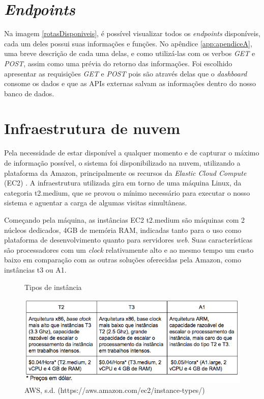 \section{\textit{Endpoints}}
\indent
\par Na imagem \ref{rotasDisponiveis}, é possível visualizar todos os \textit{endpoints} disponíveis, cada um deles possui suas informações e funções. No apêndice \ref{app:apendiceA}, uma breve descrição de cada uma delas, e como utilizá-las com os verbos \textit{GET} e \textit{POST}, assim como uma prévia do retorno das informações. Foi escolhido apresentar as requisições \textit{GET} e \textit{POST} pois são através delas que o \textit{dashboard} consome os dados e que as APIs externas salvam as informações dentro do nosso banco de dados.

\section{Infraestrutura de nuvem}
\indent
\par Pela necessidade de estar disponível a qualquer momento e de capturar o máximo de informação possível, o sistema foi disponibilizado na nuvem, utilizando a plataforma da Amazon, principalmente os recursos da \textit{Elastic Cloud Compute} (EC2) \cite{EC2}. A infraestrutura utilizada gira em torno de uma máquina Linux, da categoria t2.medium, que se provou o mínimo necessário para executar o nosso sistema e aguentar a carga de algumas visitas simultâneas.
\par Começando pela máquina, as instâncias EC2 t2.medium são máquinas com 2 núcleos dedicados, 4GB de memória RAM, indicadas tanto para o uso como plataforma de desenvolvimento quanto para servidores \textit{web}. Suas características são processadores com um \textit{clock} relativamente alto e ao mesmo tempo um custo baixo em comparação com as outras soluções oferecidas pela Amazon, como instâncias t3 ou A1. 
\begin{figure}[H]
    \centering
    \caption{Tipos de instância}
    \includegraphics[width=1.0\linewidth]{Imagens/tiposDeInstancia.png}
    \caption*{AWS, s.d. (https://aws.amazon.com/ec2/instance-types/)}
    \label{tiposDeInstancia}
\end{figure}
